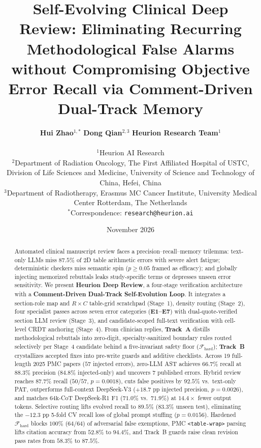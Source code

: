 \documentclass[11pt,a4paper]{article}
\title{\textbf{Self-Evolving Clinical Deep Review: Eliminating Recurring Methodological False Alarms without Compromising Objective Error Recall via Comment-Driven Dual-Track Memory}}
\author{
  \textbf{Hui Zhao}$^{1,*}$ \quad \textbf{Dong Qian}$^{2,3}$ \quad \textbf{Heurion Research Team}$^{1}$ \\[5pt]
  \parbox{0.92\textwidth}{\centering\footnotesize
    $^{1}$Heurion AI Research \\
    $^{2}$Department of Radiation Oncology, The First Affiliated Hospital of USTC, Division of Life Sciences and Medicine, University of Science and Technology of China, Hefei, China \\
    $^{3}$Department of Radiotherapy, Erasmus MC Cancer Institute, University Medical Center Rotterdam, The Netherlands \\[2pt]
    $^{*}$Correspondence: \texttt{research@heurion.ai}
  }
}
\date{November 2026}
\begin{document}
\maketitle

\begin{abstract}
Automated clinical manuscript review faces a precision--recall--memory trilemma: text-only LLMs miss $87.5\%$ of 2D table arithmetic errors with severe alert fatigue; deterministic checkers miss semantic spin ($p \ge 0.05$ framed as efficacy); and globally injecting memorized rebuttals leaks study-specific terms or depresses unseen error sensitivity. We present \textbf{Heurion Deep Review}, a four-stage verification architecture with a \textbf{Comment-Driven Dual-Track Self-Evolution Loop}. It integrates a section-role map and $R \times C$ table-grid scratchpad (Stage~1), density routing (Stage~2), four specialist passes across seven error categories (\textbf{E1--E7}) with dual-quote-verified section LLM review (Stage~3), and candidate-scoped full-text verification with cell-level CRDT anchoring (Stage~4). From clinician replies, \textbf{Track~A} distills methodological rebuttals into zero-digit, specialty-sanitized boundary rules routed selectively per Stage~4 candidate behind a five-invariant safety floor ($\mathcal{F}_{\text{hard}}$); \textbf{Track~B} crystallizes accepted fixes into pre-write guards and additive checklists. Across 19 full-length 2025 PMC papers ($57$ injected errors), zero-LLM AST achieves $66.7\%$ recall at $88.3\%$ precision ($84.8\%$ injected-only) and uncovers $7$ published errors. Hybrid review reaches $87.7\%$ recall ($50/57$, $p=0.0018$), cuts false positives by $92.5\%$ vs.\ text-only PAT, outperforms full-context DeepSeek-V3 ($+18.7\text{ pp}$ injected precision, $p=0.0026$), and matches $64\text{k}$-CoT DeepSeek-R1 F1 ($71.0\%$ vs.\ $71.9\%$) at $14.4\times$ fewer output tokens. Selective routing lifts evolved recall to $89.5\%$ ($83.3\%$ unseen test), eliminating the $-12.3\text{ pp}$ 5-fold CV recall loss of global prompt stuffing ($p=0.0156$). Hardened $\mathcal{F}_{\text{hard}}$ blocks $100\%$ ($64/64$) of adversarial false exemptions, PMC \texttt{<table-wrap>} parsing lifts citation accuracy from $52.8\%$ to $94.4\%$, and Track~B guards raise clean revision pass rates from $58.3\%$ to $87.5\%$.
\end{abstract}
\end{document}
